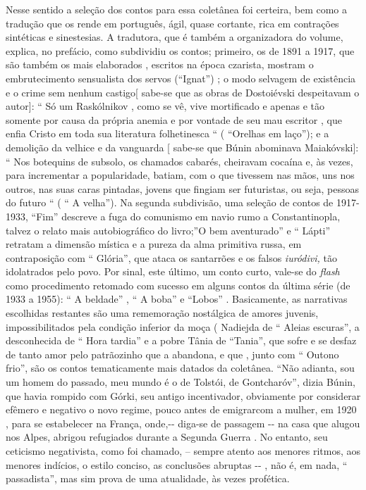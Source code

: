 Nesse sentido a seleção dos contos para essa coletânea foi certeira, bem
como a tradução que os rende em português, ágil, quase cortante, rica em
contrações sintéticas e sinestesias. A tradutora, que é também a
organizadora do volume, explica, no prefácio, como subdividiu os contos;
primeiro, os de 1891 a 1917, que são também os mais elaborados ,
escritos na época czarista, mostram o embrutecimento sensualista dos
servos (``Ignat'') ; o modo selvagem de existência e o crime sem nenhum
castigo{[} sabe-se que as obras de Dostoiévski despeitavam o autor{]}:
`` Só um Raskólnikov , como se vê, vive mortificado e apenas e tão
somente por causa da própria anemia e por vontade de seu mau escritor ,
que enfia Cristo em toda sua literatura folhetinesca `` ( ``Orelhas em
laço''); e a demolição da velhice e da vanguarda {[} sabe-se que Búnin
abominava Maiakóvski{]}: `` Nos botequins de subsolo, os chamados
cabarés, cheiravam cocaína e, às vezes, para incrementar a popularidade,
batiam, com o que tivessem nas mãos, uns nos outros, nas suas caras
pintadas, jovens que fingiam ser futuristas, ou seja, pessoas do futuro
`` ( `` A velha''). Na segunda subdivisão, uma seleção de contos de
1917-1933, ``Fim'' descreve a fuga do comunismo em navio rumo a
Constantinopla, talvez o relato mais autobiográfico do livro;''O bem
aventurado'' e `` Lápti'' retratam a dimensão mística e a pureza da alma
primitiva russa, em contraposição com `` Glória'', que ataca os
santarrões e os falsos \emph{iuródivi,} tão idolatrados pelo povo. Por
sinal, este último, um conto curto, vale-se do \emph{flash} como
procedimento retomado com sucesso em alguns contos da última série (de
1933 a 1955): `` A beldade'' , `` A boba'' e ``Lobos'' . Basicamente, as
narrativas escolhidas restantes são uma rememoração nostálgica de amores
juvenis, impossibilitados pela condição inferior da moça ( Nadiejda de
`` Aleias escuras'', a desconhecida de `` Hora tardia'' e a pobre Tânia
de ``Tania'', que sofre e se desfaz de tanto amor pelo patrãozinho que a
abandona, e que , junto com `` Outono frio'', são os contos
tematicamente mais datados da coletânea. ``Não adianta, sou um homem do
passado, meu mundo é o de Tolstói, de Gontcharóv'', dizia Búnin, que
havia rompido com Górki, seu antigo incentivador, obviamente por
considerar efêmero e negativo o novo regime, pouco antes de emigrarcom a
mulher, em 1920 , para se estabelecer na França, onde,-\/- diga-se de
passagem -\/- na casa que alugou nos Alpes, abrigou refugiados durante a
Segunda Guerra . No entanto, seu ceticismo negativista, como foi
chamado, -- sempre atento aos menores ritmos, aos menores indícios, o
estilo conciso, as conclusões abruptas -\/- , não é, em nada, ``
passadista'', mas sim prova de uma atualidade, às vezes profética.

